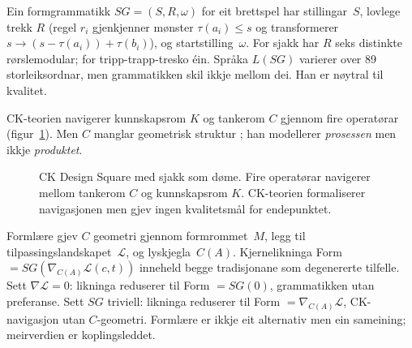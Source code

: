 \documentclass[10pt,twocolumn]{article}
\begin{document}
Ein formgrammatikk $SG = (S, R, \omega)$ for eit brettspel har stillingar~$S$, lovlege trekk $R$ (regel $r_i$ gjenkjenner m\o nster $\tau(a_i) \leq s$ og transformerer $s \to (s - \tau(a_i)) + \tau(b_i)$), og startstilling~$\omega$. For sjakk har $R$ seks distinkte r\o rslemodular; for tripp-trapp-tresko \'ein. Spr\aa ka $L(SG)$ varierer over 89 storleiksordnar, men grammatikken skil ikkje mellom dei. Han er n\o ytral til kvalitet.

CK-teorien navigerer kunnskapsrom $K$ og tankerom $C$ gjennom fire operat\o rar (figur~\ref{fig:cksquare}). Men $C$ manglar geometrisk struktur \citep{coatanea2010}; han modellerer \textit{prosessen} men ikkje \textit{produktet}.

\begin{figure}[t]
\centering
{}
\caption{CK Design Square med sjakk som d\o me. Fire operat\o rar navigerer mellom tankerom $C$ og kunnskapsrom $K$. CK-teorien formaliserer navigasjonen men gjev ingen kvalitetsm\aa l for endepunktet.}
\label{fig:cksquare}
\end{figure}

Forml\ae re gjev $C$ geometri gjennom formrommet~$M$, legg til tilpassingslandskapet~$\mathcal{L}$, og lyskjegla~$C(A)$. Kjernelikninga Form $= SG(\nabla_{C(A)} \mathcal{L}(c,t))$ inneheld begge tradisjonane som degenererte tilfelle. Sett $\nabla \mathcal{L} = 0$: likninga reduserer til Form $= SG(0)$, grammatikken utan preferanse. Sett $SG$ triviell: likninga reduserer til Form $= \nabla_{C(A)} \mathcal{L}$, CK-navigasjon utan $C$-geometri. Forml\ae re er ikkje eit alternativ men ein sameining; meirverdien er koplingsleddet.
\end{document}
